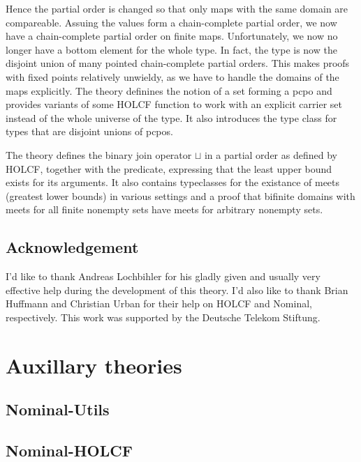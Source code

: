 \documentclass[11pt,a4paper,parskip=half]{scrartcl}
\begin{document}
Hence the partial order is changed so that only maps with the same domain are compareable. Assuing the values form a chain-complete partial order, we now have a chain-complete partial order on finite maps. Unfortunately, we now no longer have a bottom element for the whole type. In fact, the type is now the disjoint union of many pointed chain-complete partial orders. This makes proofs with fixed points relatively unwieldy, as we have to handle the domains of the maps explicitly. The theory  definines the notion of a set forming a pcpo and provides variants of some HOLCF function to work with an explicit carrier set instead of the whole universe of the type. It also introduces the type class  for types that are disjoint unions of pcpos.

The theory  defines the binary join operator $\sqcup$ in a partial order as defined by HOLCF, together with the  predicate, expressing that the least upper bound exists for its arguments. It also contains typeclasses for the existance of meets (greatest lower bounds) in various settings and a proof that bifinite domains with meets for all finite nonempty sets have meets for arbitrary nonempty sets.

\subsection{Acknowledgement}

I’d like to thank Andreas Lochbihler for his gladly given and usually very effective help during the development of this theory. I’d also like to thank Brian Huffmann and Christian Urban for their help on HOLCF and Nominal, respectively. This work was supported by the Deutsche Telekom Stiftung.

\clearpage
\newcommand{\theory}[1]{\subsection{#1}\label{sec_#1}}

\section{Auxillary theories}

\label{ch_aux}

\theory{Nominal-Utils}


\theory{Nominal-HOLCF}
\end{document}
